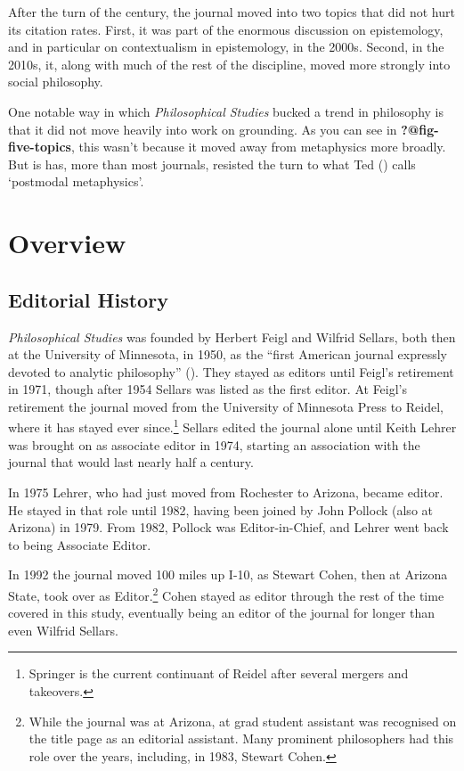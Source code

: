 \documentclass[
  10pt,
  letterpaper,
  DIV=11,
  numbers=noendperiod,
  twoside]{scrartcl}
\begin{document}
After the turn of the century, the journal moved into two topics that
did not hurt its citation rates. First, it was part of the enormous
discussion on epistemology, and in particular on contextualism in
epistemology, in the 2000s. Second, in the 2010s, it, along with much of
the rest of the discipline, moved more strongly into social philosophy.

One notable way in which \emph{Philosophical Studies} bucked a trend in
philosophy is that it did not move heavily into work on grounding. As
you can see in \textbf{?@fig-five-topics}, this wasn't because it moved
away from metaphysics more broadly. But is has, more than most journals,
resisted the turn to what Ted
() calls `postmodal
metaphysics'.

\section{Overview}\label{sec-overview}

\subsection{Editorial History}\label{editorial-history}

\emph{Philosophical Studies} was founded by Herbert Feigl and Wilfrid
Sellars, both then at the University of Minnesota, in 1950, as the
``first American journal expressly devoted to analytic philosophy''
(). They stayed as
editors until Feigl's retirement in 1971, though after 1954 Sellars was
listed as the first editor. At Feigl's retirement the journal moved from
the University of Minnesota Press to Reidel, where it has stayed ever
since.\footnote{Springer is the current continuant of Reidel after
  several mergers and takeovers.} Sellars edited the journal alone until
Keith Lehrer was brought on as associate editor in 1974, starting an
association with the journal that would last nearly half a century.

In 1975 Lehrer, who had just moved from Rochester to Arizona, became
editor. He stayed in that role until 1982, having been joined by John
Pollock (also at Arizona) in 1979. From 1982, Pollock was
Editor-in-Chief, and Lehrer went back to being Associate Editor.

In 1992 the journal moved 100 miles up I-10, as Stewart Cohen, then at
Arizona State, took over as Editor.\footnote{While the journal was at
  Arizona, at grad student assistant was recognised on the title page as
  an editorial assistant. Many prominent philosophers had this role over
  the years, including, in 1983, Stewart Cohen.} Cohen stayed as editor
through the rest of the time covered in this study, eventually being an
editor of the journal for longer than even Wilfrid Sellars.
\end{document}

